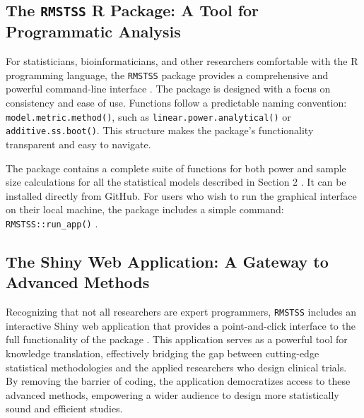 \documentclass[article]{jss}
\begin{document}
\subsection{The \texttt{RMSTSS} R Package: A Tool for Programmatic Analysis}
For statisticians, bioinformaticians, and other researchers comfortable with the R programming language, the \texttt{RMSTSS} package provides a comprehensive and powerful command-line interface \cite{[1]}. The package is designed with a focus on consistency and ease of use. Functions follow a predictable naming convention: \texttt{model.metric.method()}, such as \texttt{linear.power.analytical()} or \texttt{additive.ss.boot()}. This structure makes the package's functionality transparent and easy to navigate.

The package contains a complete suite of functions for both power and sample size calculations for all the statistical models described in Section 2 \cite{[1]}. It can be installed directly from GitHub. For users who wish to run the graphical interface on their local machine, the package includes a simple command: \texttt{RMSTSS::run\_app()} \cite{[1, 1]}.

\subsection{The Shiny Web Application: A Gateway to Advanced Methods}
Recognizing that not all researchers are expert programmers, \texttt{RMSTSS} includes an interactive Shiny web application that provides a point-and-click interface to the full functionality of the package \cite{[1]}. This application serves as a powerful tool for knowledge translation, effectively bridging the gap between cutting-edge statistical methodologies and the applied researchers who design clinical trials. By removing the barrier of coding, the application democratizes access to these advanced methods, empowering a wider audience to design more statistically sound and efficient studies.
\end{document}
